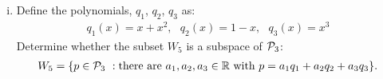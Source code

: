 \begin{question}
\begin{enumerate}[(i)]
              \vspace{.6cm}


        \item
              Define the polynomials, $q_1$, $q_2$, $q_3$ as:
              \begin{align*}
                  q_1(x) = x+x^2,\ \ \ q_2(x) = 1-x,\ \ \ q_3(x) = x^3
              \end{align*}
              Determine whether the subset $W_5$  is a subspace of $\P_3$:
              \begin{align*}
                  W_5 =
                  \{ p\in\P_3\ : \text{there are}\ a_1,a_2,a_3\in\real\ \text{with}\ p=a_1 q_1 + a_2 q_2 + a_3 q_3 \}.
              \end{align*}

    \end{enumerate}
\end{question}

